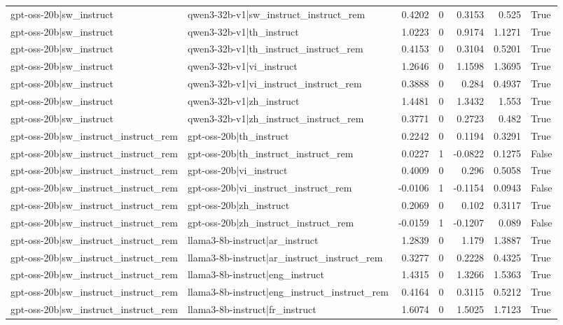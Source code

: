 \begin{table}
\begin{tabular}{l l r r r r l}
gpt-oss-20b|sw_instruct & qwen3-32b-v1|sw_instruct_instruct_rem & 0.4202 & 0 & 0.3153 & 0.525 & True \\
gpt-oss-20b|sw_instruct & qwen3-32b-v1|th_instruct & 1.0223 & 0 & 0.9174 & 1.1271 & True \\
gpt-oss-20b|sw_instruct & qwen3-32b-v1|th_instruct_instruct_rem & 0.4153 & 0 & 0.3104 & 0.5201 & True \\
gpt-oss-20b|sw_instruct & qwen3-32b-v1|vi_instruct & 1.2646 & 0 & 1.1598 & 1.3695 & True \\
gpt-oss-20b|sw_instruct & qwen3-32b-v1|vi_instruct_instruct_rem & 0.3888 & 0 & 0.284 & 0.4937 & True \\
gpt-oss-20b|sw_instruct & qwen3-32b-v1|zh_instruct & 1.4481 & 0 & 1.3432 & 1.553 & True \\
gpt-oss-20b|sw_instruct & qwen3-32b-v1|zh_instruct_instruct_rem & 0.3771 & 0 & 0.2723 & 0.482 & True \\
gpt-oss-20b|sw_instruct_instruct_rem & gpt-oss-20b|th_instruct & 0.2242 & 0 & 0.1194 & 0.3291 & True \\
gpt-oss-20b|sw_instruct_instruct_rem & gpt-oss-20b|th_instruct_instruct_rem & 0.0227 & 1 & -0.0822 & 0.1275 & False \\
gpt-oss-20b|sw_instruct_instruct_rem & gpt-oss-20b|vi_instruct & 0.4009 & 0 & 0.296 & 0.5058 & True \\
gpt-oss-20b|sw_instruct_instruct_rem & gpt-oss-20b|vi_instruct_instruct_rem & -0.0106 & 1 & -0.1154 & 0.0943 & False \\
gpt-oss-20b|sw_instruct_instruct_rem & gpt-oss-20b|zh_instruct & 0.2069 & 0 & 0.102 & 0.3117 & True \\
gpt-oss-20b|sw_instruct_instruct_rem & gpt-oss-20b|zh_instruct_instruct_rem & -0.0159 & 1 & -0.1207 & 0.089 & False \\
gpt-oss-20b|sw_instruct_instruct_rem & llama3-8b-instruct|ar_instruct & 1.2839 & 0 & 1.179 & 1.3887 & True \\
gpt-oss-20b|sw_instruct_instruct_rem & llama3-8b-instruct|ar_instruct_instruct_rem & 0.3277 & 0 & 0.2228 & 0.4325 & True \\
gpt-oss-20b|sw_instruct_instruct_rem & llama3-8b-instruct|eng_instruct & 1.4315 & 0 & 1.3266 & 1.5363 & True \\
gpt-oss-20b|sw_instruct_instruct_rem & llama3-8b-instruct|eng_instruct_instruct_rem & 0.4164 & 0 & 0.3115 & 0.5212 & True \\
gpt-oss-20b|sw_instruct_instruct_rem & llama3-8b-instruct|fr_instruct & 1.6074 & 0 & 1.5025 & 1.7123 & True \\

\end{tabular}
\end{table}
